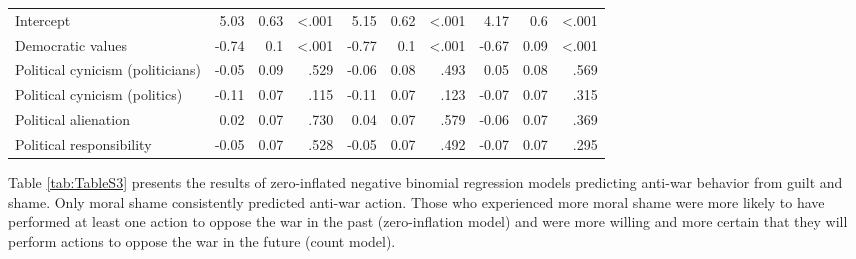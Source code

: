 \documentclass[
]{article}
\begin{document}
\begin{table}[H]
\begin{tabular}[t]{lrrrrrrrrr}
\midrule
Intercept & 5.03 & 0.63 & <.001 & 5.15 & 0.62 & <.001 & 4.17 & 0.6 & <.001\\
Democratic values & -0.74 & 0.1 & <.001 & -0.77 & 0.1 & <.001 & -0.67 & 0.09 & <.001\\
\addlinespace
Political cynicism (politicians) & -0.05 & 0.09 & .529 & -0.06 & 0.08 & .493 & 0.05 & 0.08 & .569\\
Political cynicism (politics) & -0.11 & 0.07 & .115 & -0.11 & 0.07 & .123 & -0.07 & 0.07 & .315\\
Political alienation & 0.02 & 0.07 & .730 & 0.04 & 0.07 & .579 & -0.06 & 0.07 & .369\\
Political responsibility & -0.05 & 0.07 & .528 & -0.05 & 0.07 & .492 & -0.07 & 0.07 & .295\\
\bottomrule
\end{tabular}
\end{table}

Table \ref{tab:TableS3} presents the results of zero-inflated negative binomial regression models predicting anti-war behavior from guilt and shame. Only moral shame consistently predicted anti-war action. Those who experienced more moral shame were more likely to have performed at least one action to oppose the war in the past (zero-inflation model) and were more willing and more certain that they will perform actions to oppose the war in the future (count model).
\end{document}
